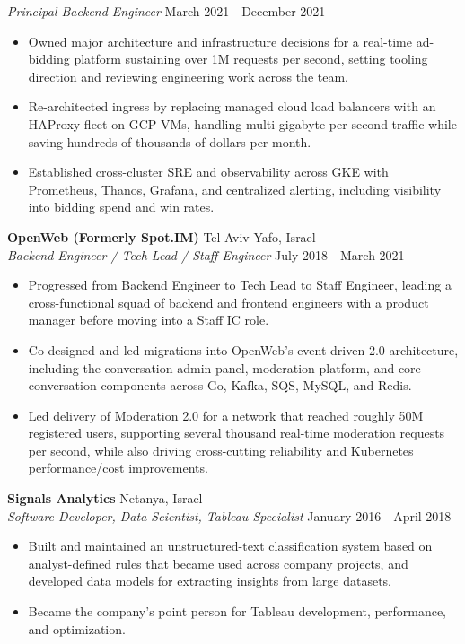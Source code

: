\documentclass[a4paper]{article}
\begin{document}
\textit{Principal Backend Engineer} \hfill March 2021 - December 2021\\
\vspace{-1mm}
\begin{itemize} \itemsep 1pt
	\item Owned major architecture and infrastructure decisions for a real-time ad-bidding platform sustaining over 1M requests per second, setting tooling direction and reviewing engineering work across the team.
	\item Re-architected ingress by replacing managed cloud load balancers with an HAProxy fleet on GCP VMs, handling multi-gigabyte-per-second traffic while saving hundreds of thousands of dollars per month.
	\item Established cross-cluster SRE and observability across GKE with Prometheus, Thanos, Grafana, and centralized alerting, including visibility into bidding spend and win rates.
\end{itemize}
\textbf{OpenWeb (Formerly Spot.IM)} \hfill Tel Aviv-Yafo, Israel\\
\textit{Backend Engineer / Tech Lead / Staff Engineer} \hfill July 2018 - March 2021\\
\vspace{-1mm}
\begin{itemize} \itemsep 1pt
	\item Progressed from Backend Engineer to Tech Lead to Staff Engineer, leading a cross-functional squad of backend and frontend engineers with a product manager before moving into a Staff IC role.
	\item Co-designed and led migrations into OpenWeb's event-driven 2.0 architecture, including the conversation admin panel, moderation platform, and core conversation components across Go, Kafka, SQS, MySQL, and Redis.
	\item Led delivery of Moderation 2.0 for a network that reached roughly 50M registered users, supporting several thousand real-time moderation requests per second, while also driving cross-cutting reliability and Kubernetes performance/cost improvements.
\end{itemize}
\textbf{Signals Analytics} \hfill Netanya, Israel\\
\textit{Software Developer, Data Scientist, Tableau Specialist} \hfill January 2016 - April 2018\\
\vspace{-1mm}
\begin{itemize} \itemsep 1pt
	\item Built and maintained an unstructured-text classification system based on analyst-defined rules that became used across company projects, and developed data models for extracting insights from large datasets.
	\item Became the company's point person for Tableau development, performance, and optimization.
\end{itemize}
\end{document}

